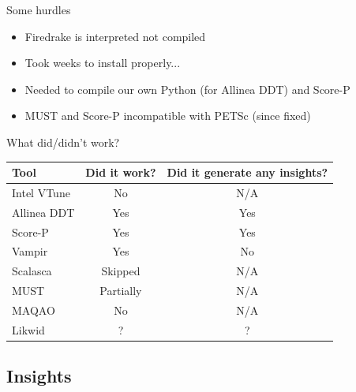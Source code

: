 \documentclass[pdf,aspectratio=169]{beamer}
\begin{document}
\begin{frame}{Some hurdles}
  \begin{itemize}
    \item Firedrake is interpreted not compiled
    \item Took weeks to install properly...
    \item Needed to compile our own Python (for Allinea DDT) and Score-P
    \item MUST and Score-P incompatible with PETSc (since fixed)
  \end{itemize}
\end{frame}

\begin{frame}{What did/didn't work?}
  \centering
  \begin{tabular}{l|c|c}
    \textbf{Tool} & \textbf{Did it work?} & \textbf{Did it generate any insights?} \\
    \hline
    Intel VTune & No & N/A \\
    Allinea DDT & Yes & Yes \\
    Score-P & Yes & Yes \\
    Vampir & Yes & No \\
    Scalasca & Skipped & N/A \\
    MUST & Partially & N/A \\
    MAQAO & No & N/A \\
    Likwid & ? & ?
  \end{tabular}
\end{frame}


\subsection{Insights}
\end{document}

